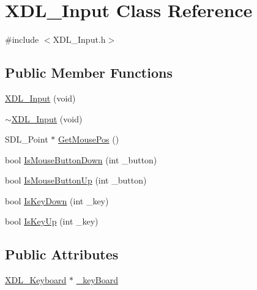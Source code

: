 \hypertarget{class_x_d_l___input}{\section{X\-D\-L\-\_\-\-Input Class Reference}
\label{class_x_d_l___input}
}


{\ttfamily \#include $<$X\-D\-L\-\_\-\-Input.\-h$>$}

\subsection*{Public Member Functions}
\begin{DoxyCompactItemize}
\item 
\hyperlink{class_x_d_l___input_a201db476883e27a4da2ec6c226fdf97a}{X\-D\-L\-\_\-\-Input} (void)
\item 
\hyperlink{class_x_d_l___input_ab67b598971e3d649f21e1005252e8d79}{$\sim$\-X\-D\-L\-\_\-\-Input} (void)
\item 
S\-D\-L\-\_\-\-Point $\ast$ \hyperlink{class_x_d_l___input_a927bc4eb2fcd249584add5d9c9005627}{Get\-Mouse\-Pos} ()
\item 
bool \hyperlink{class_x_d_l___input_abb3ecefb33c51d0ace63d145110f75c5}{Is\-Mouse\-Button\-Down} (int \-\_\-button)
\item 
bool \hyperlink{class_x_d_l___input_a2b7295d8c171019eee81ea81144277a9}{Is\-Mouse\-Button\-Up} (int \-\_\-button)
\item 
bool \hyperlink{class_x_d_l___input_ae8de8b0399f53648a4a1c1c9dcb41a22}{Is\-Key\-Down} (int \-\_\-key)
\item 
bool \hyperlink{class_x_d_l___input_aad0207a7d0232c69f3c086ae81533857}{Is\-Key\-Up} (int \-\_\-key)
\end{DoxyCompactItemize}
\subsection*{Public Attributes}
\begin{DoxyCompactItemize}
\item 
\hyperlink{class_x_d_l___keyboard}{X\-D\-L\-\_\-\-Keyboard} $\ast$ \hyperlink{class_x_d_l___input_a13a14229d77189cd4aa76566ff0f38a6}{\-\_\-key\-Board}
\end{DoxyCompactItemize}


